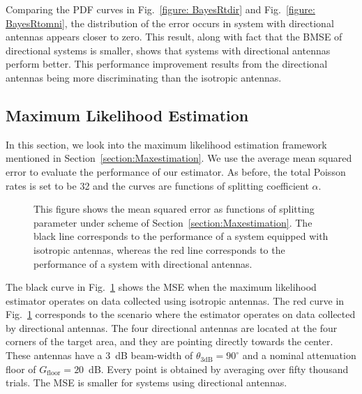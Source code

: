 Comparing the PDF curves in Fig.~\ref{figure: BayesRtdir} and Fig.~\ref{figure: BayesRtomni}, the distribution of the error occurs in system with directional antennas appears closer to zero.
This result, along with fact that the BMSE of directional systems is smaller, shows that systems with directional antennas perform better.
This performance improvement results from the directional antennas being more discriminating than the isotropic antennas. 


\subsection{Maximum Likelihood Estimation}

In this section, we look into the maximum likelihood estimation framework mentioned in Section~\ref{section:Maxestimation}.
We use the average mean squared error to evaluate the performance of our estimator.
As before, the total Poisson rates is set to be 32 and the curves are functions of splitting coefficient $\alpha$.
\begin{figure}[t]
	\centerline{}
	\caption{This figure shows the mean squared error as functions of splitting parameter under scheme of Section~\ref{section:Maxestimation}.
		The black line corresponds to the performance of a system equipped with isotropic antennas, whereas the red line corresponds to the performance of a system with directional antennas.}
	\label{figure: MaxRt}
\end{figure}
The black curve in Fig.~\ref{figure: MaxRt} shows the MSE when the maximum likelihood estimator operates on data collected using isotropic antennas.
The red curve in Fig.~\ref{figure: MaxRt} corresponds to the scenario where the estimator operates on data collected by directional antennas.
The four directional antennas are located at the four corners of the target area, and they are pointing directly towards the center.
These antennas have a 3~dB beam-width of $\theta_{\mathrm{3dB}} = 90^{\circ}$ and a nominal attenuation floor of $G_{\mathrm{floor}} = 20$~dB.
Every point is obtained by averaging over fifty thousand trials.
The MSE is smaller for systems using directional antennas.

